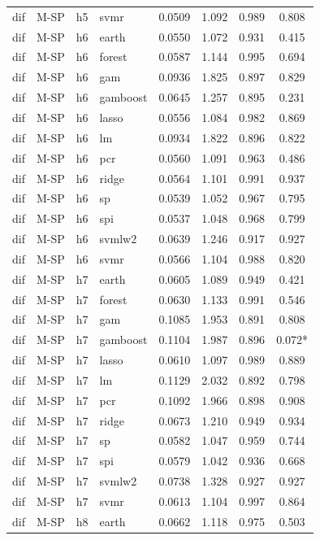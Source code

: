 \begin{ThreePartTable}
\begin{longtable}[t]{llclcccc}
dif & M-SP & h5 & svmr & 0.0509 & 1.092 & 0.989 & 0.808\\
\addlinespace
dif & M-SP & h6 & earth & 0.0550 & 1.072 & 0.931 & 0.415\\
dif & M-SP & h6 & forest & 0.0587 & 1.144 & 0.995 & 0.694\\
dif & M-SP & h6 & gam & 0.0936 & 1.825 & 0.897 & 0.829\\
dif & M-SP & h6 & gamboost & 0.0645 & 1.257 & 0.895 & 0.231\\
dif & M-SP & h6 & lasso & 0.0556 & 1.084 & 0.982 & 0.869\\
dif & M-SP & h6 & lm & 0.0934 & 1.822 & 0.896 & 0.822\\
dif & M-SP & h6 & pcr & 0.0560 & 1.091 & 0.963 & 0.486\\
dif & M-SP & h6 & ridge & 0.0564 & 1.101 & 0.991 & 0.937\\
dif & M-SP & h6 & sp & 0.0539 & 1.052 & 0.967 & 0.795\\
dif & M-SP & h6 & spi & 0.0537 & 1.048 & 0.968 & 0.799\\
dif & M-SP & h6 & svmlw2 & 0.0639 & 1.246 & 0.917 & 0.927\\
dif & M-SP & h6 & svmr & 0.0566 & 1.104 & 0.988 & 0.820\\
\addlinespace
dif & M-SP & h7 & earth & 0.0605 & 1.089 & 0.949 & 0.421\\
dif & M-SP & h7 & forest & 0.0630 & 1.133 & 0.991 & 0.546\\
dif & M-SP & h7 & gam & 0.1085 & 1.953 & 0.891 & 0.808\\
dif & M-SP & h7 & gamboost & 0.1104 & 1.987 & 0.896 & 0.072*\\
dif & M-SP & h7 & lasso & 0.0610 & 1.097 & 0.989 & 0.889\\
dif & M-SP & h7 & lm & 0.1129 & 2.032 & 0.892 & 0.798\\
dif & M-SP & h7 & pcr & 0.1092 & 1.966 & 0.898 & 0.908\\
dif & M-SP & h7 & ridge & 0.0673 & 1.210 & 0.949 & 0.934\\
dif & M-SP & h7 & sp & 0.0582 & 1.047 & 0.959 & 0.744\\
dif & M-SP & h7 & spi & 0.0579 & 1.042 & 0.936 & 0.668\\
dif & M-SP & h7 & svmlw2 & 0.0738 & 1.328 & 0.927 & 0.927\\
dif & M-SP & h7 & svmr & 0.0613 & 1.104 & 0.997 & 0.864\\
\addlinespace
dif & M-SP & h8 & earth & 0.0662 & 1.118 & 0.975 & 0.503\\

\end{longtable}
\end{ThreePartTable}
